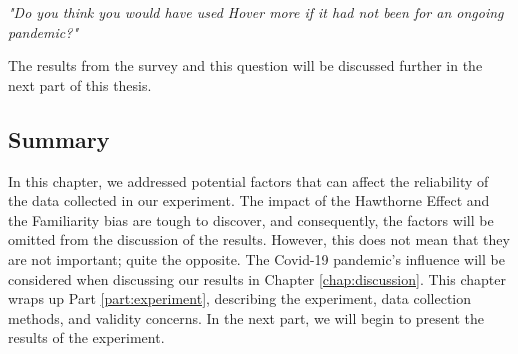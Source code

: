 \textit{"Do you think you would have used Hover more if it had not been for an ongoing pandemic?"}

The results from the survey and this question will be discussed further in the next part of this thesis.

\subsection{Summary}
In this chapter, we addressed potential factors that can affect the reliability of the data collected in our experiment. The impact of the Hawthorne Effect and the Familiarity bias are tough to discover, and consequently, the factors will be omitted from the discussion of the results. However, this does not mean that they are not important; quite the opposite. The Covid-19 pandemic’s influence will be considered when discussing our results in Chapter \ref{chap:discussion}. This chapter wraps up Part \ref{part:experiment}, describing the experiment, data collection methods, and validity concerns. In the next part, we will begin to present the results of the experiment.